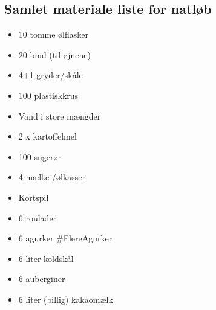 \subsection{Samlet materiale liste for natløb}
\begin{multicols}{2}
\begin{itemize}
\item 10 tomme ølflasker
\item 20 bind (til øjnene)
\item 4+1 gryder/skåle
\item 100 plastiskkrus
\item Vand i store mængder
\item 2 x kartoffelmel
\item 100 sugerør
\item 4 mælke-/ølkasser
\item Kortspil
\item 6 roulader
\item 6 agurker \#FlereAgurker
\item 6 liter koldskål
\item 6 auberginer
\item 6 liter (billig) kakaomælk
\end{itemize}
\end{multicols}